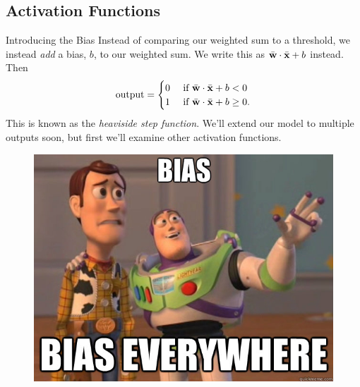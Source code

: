 \documentclass[xcolor=dvipsnames, fontsize=11pt, %
pagesize, %
parskip=half-, t]{beamer}
\begin{document}
\subsection{Activation Functions}
\begin{frame}[c]{Introducing the Bias}
Instead of comparing our weighted sum to a threshold, we instead \textit{add} a bias, $b$, to our weighted sum. We write this as $\bar{\bold{w}}\cdot \bar{\bold{x}}+b$ instead. \pause Then $$\text{output}=\begin{cases} 0 & \text{ if } \bar{\bold{w}}\cdot \bar{\bold{x}}+b<0 \\ 
1 & \text{ if } \bar{\bold{w}}\cdot \bar{\bold{x}}+b\ge 0. \end{cases}$$
This is known as the \textit{heaviside step function}. We'll extend our model to multiple outputs soon, but first we'll examine other activation functions. \pause
\begin{figure}
\includegraphics[scale=0.23]{bias.jpg} 
\end{figure}
\end{frame}
\end{document}
